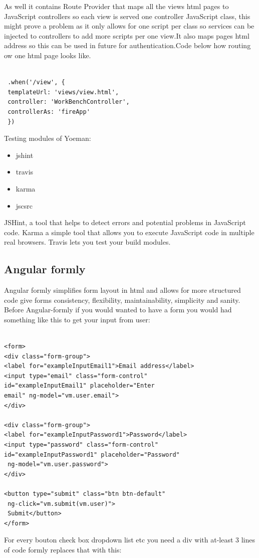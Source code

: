 As well it contains Route Provider that maps all the views html pages to JavaScript controllers so each view is served one controller JavaScript class, this might prove a problem as it only allows for one script per class so services can be injected to controllers to add more scripts per one view.It also maps pages html address so this can be used in future for authentication.Code below how routing ow one html page looks like.
\bigbreak
\begin{verbatim}

 .when('/view', {
 templateUrl: 'views/view.html',
 controller: 'WorkBenchController',
 controllerAs: 'fireApp'
 })

\end{verbatim}
\bigbreak
Testing modules of Yoeman:
\bigbreak

\begin{itemize}
	
	\item jshint 
	\item travis
	\item karma
	\item jscsrc
	
\end{itemize}
\bigbreak

JSHint, a tool that helps to detect errors and potential problems in  JavaScript code.
Karma a simple tool that allows you to execute JavaScript code in multiple real browsers.
Travis lets you test your build modules.






\subsection{Angular formly}
\bigbreak
Angular formly simplifies form layout in html and allows for more structured code give forms consistency, flexibility, maintainability, simplicity and sanity. Before Angular-formly if you would wanted to have a form you would had something like this to get your input from user:

\bigbreak
\begin{verbatim}

<form>
<div class="form-group">
<label for="exampleInputEmail1">Email address</label>
<input type="email" class="form-control" 
id="exampleInputEmail1" placeholder="Enter 
email" ng-model="vm.user.email">
</div>

<div class="form-group">
<label for="exampleInputPassword1">Password</label>
<input type="password" class="form-control" 
id="exampleInputPassword1" placeholder="Password"
 ng-model="vm.user.password">
</div>

<button type="submit" class="btn btn-default"
 ng-click="vm.submit(vm.user)">
 Submit</button>
</form>

\end{verbatim}
\bigbreak
For every bouton check box dropdown list etc you need a div with at-least 3 lines of code formly replaces that with this:
\bigbreak


